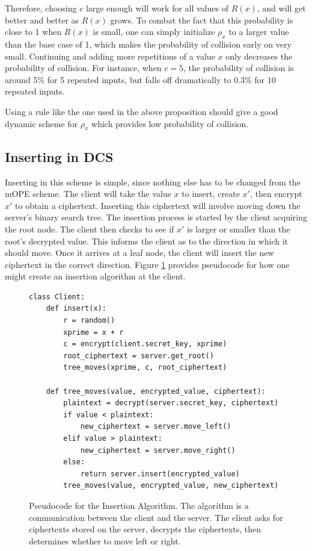 \documentclass[12pt]{article}
\begin{document}
Therefore, choosing $c$ large enough will work for all values of $R(x)$, and will get better and better as $R(x)$ grows. To combat the fact that this probability is close to 1 when $R(x)$ is small, one can simply initialize $\rho_x$ to a larger value than the base case of 1, which makes the probability of collision early on very small. Continuing and adding more repetitions of a value $x$ only decreases the probability of collision. For instance, when $c = 5$, the probability of collision is around 5\% for 5 repeated inputs, but falls off dramatically to 0.3\% for 10 repeated inputs.

Using a rule like the one used in the above proposition should give a good dynamic scheme for $\rho_x$ which provides low probability of collision.

\subsection{Inserting in DCS}

Inserting in this scheme is simple, since nothing else has to be changed from the mOPE scheme. The client will take the value $x$ to insert, create $x'$, then encrypt $x'$ to obtain a ciphertext. Inserting this ciphertext will involve moving down the server's binary search tree. The insertion process is started by the client acquiring the root node. The client then checks to see if $x'$ is larger or smaller than the root's decrypted value. This informs the client as to the direction in which it should move. Once it arrives at a leaf node, the client will insert the new ciphertext in the correct direction. Figure \ref{insertion_figure} provides pseudocode for how one might create an insertion algorithm at the client.

\begin{figure}[htb]
\lstset{language=Python}
\begin{lstlisting}[frame=single]
class Client:
    def insert(x):
        r = random()
        xprime = x + r
        c = encrypt(client.secret_key, xprime)
        root_ciphertext = server.get_root()
        tree_moves(xprime, c, root_ciphertext)

    def tree_moves(value, encrypted_value, ciphertext):
        plaintext = decrypt(server.secret_key, ciphertext)
        if value < plaintext:
            new_ciphertext = server.move_left()
        elif value > plaintext:
            new_ciphertext = server.move_right()
        else:
            return server.insert(encrypted_value)
        tree_moves(value, encrypted_value, new_ciphertext)
\end{lstlisting}
\caption{Pseudocode for the Insertion Algorithm. The algorithm is a communication between the client and the server. The client asks for ciphertexts stored on the server, decrypts the ciphertexts, then determines whether to move left or right.}
\label{insertion_figure}
\end{figure}
\end{document}
